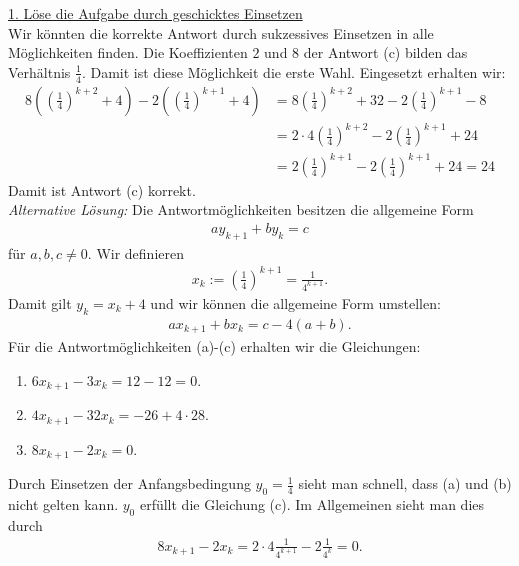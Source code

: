 \underline{1. Löse die Aufgabe durch geschicktes Einsetzen}\\
Wir könnten die korrekte Antwort durch sukzessives Einsetzen in alle Möglichkeiten finden. Die Koeffizienten $2$ und $8$ der Antwort (c) bilden das Verhältnis $\frac{1}{4}$. Damit ist diese Möglichkeit die erste Wahl. Eingesetzt erhalten wir:
\begin{align*}
	8 \left( \left(\frac{1}{4}\right)^{k+2} + 4 \right) 
	-
	2 \left(\left(\frac{1}{4}\right)^{k+1} + 4\right)
	&=
	8 \left(\frac{1}{4}\right)^{k+2}  + 32
	- 2 \left(\frac{1}{4}\right)^{k+1} - 8\\
	&=
	2 \cdot 4 \left(\frac{1}{4}\right)^{k+2} - 2 \left(\frac{1}{4}\right)^{k+1} + 24\\
	&=
	2  \left(\frac{1}{4}\right)^{k+1} - 2 \left(\frac{1}{4}\right)^{k+1}  + 24
	= 24
\end{align*}
Damit ist Antwort (c) korrekt.
\\
\textit{Alternative Lösung:} 
Die Antwortmöglichkeiten besitzen die allgemeine Form
\begin{align*}
	a y_{k+1} + b y_k = c
\end{align*}
für $a ,b ,c \neq 0$. Wir definieren 
\begin{align*}
	x_k := \left(\frac{1}{4}\right)^{k+1} = \frac{1}{4^{k+1}}.
\end{align*}
Damit gilt $y_k = x_k + 4$ und wir können die allgemeine Form umstellen:
\begin{align*}
	a x_{k+1} + b x_k = c - 4(a+b).
\end{align*}
Für die Antwortmöglichkeiten (a)-(c) erhalten wir die Gleichungen:
\begin{enumerate}
	\item $6 x_{k+1} - 3 x_k = 12 - 12 = 0$.
	\item $4 x_{k+1} - 32 x_k = -26 + 4 \cdot 28$.
	\item $8 x_{k+1} - 2 x_k = 0$.
\end{enumerate}
Durch Einsetzen der Anfangsbedingung $y_0 = \frac{1}{4}$ sieht man schnell, dass (a) und (b) nicht gelten kann. 
$y_0$ erfüllt die Gleichung (c). Im Allgemeinen sieht man dies durch
\begin{align*}
	8 x_{k+1} - 2 x_k = 2 \cdot 4 \frac{1}{4^{k+1}} - 2 \frac{1}{4^k} = 0.
\end{align*}
\newpage


